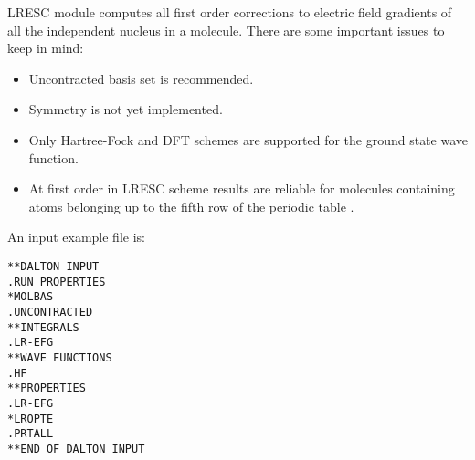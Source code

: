 \begin{center}
\end{center}

LRESC module computes all first order corrections to electric field gradients of all the independent nucleus in a molecule.
There are some important issues to keep in mind:
\begin{center}
\begin{itemize}{}{}
\item Uncontracted basis set is recommended. 
\item Symmetry is not yet implemented.
\item Only Hartree-Fock and DFT schemes are supported for the ground state wave function.
\item At first order in LRESC scheme results are reliable for molecules containing atoms belonging up to the fifth row of the periodic table \cite{melomaldo19,aucarmaldomelo21}. 
\end{itemize}
\end{center}


An input example file is:

\begin{verbatim}
**DALTON INPUT
.RUN PROPERTIES
*MOLBAS
.UNCONTRACTED
**INTEGRALS
.LR-EFG
**WAVE FUNCTIONS
.HF
**PROPERTIES
.LR-EFG
*LROPTE
.PRTALL
**END OF DALTON INPUT
\end{verbatim}

